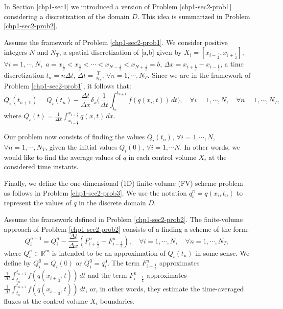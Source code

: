 In Section \ref{chp1-sec1} we introduced a version of Problem \ref{chp1-sec2-prob1}
considering a discretization of the domain $D$. 
This idea is summarized in Problem \ref{chp1-sec2-prob2}.
\begin{prob}
        \label{chp1-sec2-prob2}
	Assume the framework of Problem \ref{chp1-sec2-prob1}.
        We consider positive integers $N$ and $N_T$, a spatial discretization of [a,b] given by
        $X_i = [x_{i-\frac{1}{2}}, x_{i+\frac{1}{2}}]$,
        $\forall i = 1, \cdots, N,$ 
	$a = x_{\frac{1}{2}} < x_{\frac{3}{2}} < \cdots < x_{N-\frac{1}{2}} < x_{N+\frac{1}{2}} = b$,
	$\Delta x = x_{i+\frac{1}{2}}-x_{i-\frac{1}{2}}$,
	a time discretization
        $t_n = n\Delta t$, $\Delta t = \frac{T}{N_T}$, $\forall n = 1, \cdots, N_T$.
	Since we are in the framework of Problem \ref{chp1-sec2-prob1}, it follows that:
        \begin{equation*}
                {Q}_i(t_{n+1}) =  {Q}_i(t_n) -
                \frac{\Delta t}{\Delta x} \delta _x\bigg( \frac{1}{\Delta t}\int_{t_n}^{t_{n+1}}
                {f}({q}(x_{i}, t)) \,dt \bigg),
                \quad \forall i = 1, \cdots, N,
                \quad \forall n = 1, \cdots, N_T,
        \end{equation*}
        where ${Q}_i(t) = \frac{1}{\Delta x}
        \int_{x_{i-\frac{1}{2}}}^{x_{i+\frac{1}{2}}} {q}(x,t) \,dx$.
	
	Our problem now consists of finding the values ${Q}_i(t_{n})$, 
	$\forall i = 1, \cdots, N$, $\forall n = 1, \cdots, N_T$,
	given the initial values ${Q}_i(0)$, $\forall i = 1, \cdots N$.
	In other words, we would like to find the average values of ${q}$
	in each control volume $X_i$ at the considered time instants.
\end{prob}

Finally, we define the one-dimensional (1D) finite-volume (FV)
scheme problem as follows in Problem \ref{chp1-sec2-prob3}.
We use the notation ${q}^n_{i} = {q}(x_i, t_n)$
to represent the values of ${q}$ in the discrete domain $D$.

\begin{prob}[1D-FV scheme]
	\label{chp1-sec2-prob3}
	Assume the framework defined in Problem \ref{chp1-sec2-prob2}.
	The finite-volume approach of Problem \ref{chp1-sec2-prob2}
	consists of a finding a scheme of the form:
        \begin{equation*}
		{Q}_{i}^{n+1} =  {Q}_{i}^{n} -
		\frac{\Delta t}{\Delta x} ({F}_{i+\frac{1}{2}}^{n} - {F}_{i-\frac{1}{2}}^{n}),
                \quad \forall i = 1, \cdots, N,
                \quad \forall n = 1, \cdots, N_T,
        \end{equation*}
	where ${Q}_{i}^{n} \in \mathbb{R}^m$ is intended to be an approximation
	of ${Q}_i(t_{n})$ in some sense. We define by ${Q}_{i}^{0} = {Q}_i(0)$ or
	${Q}_{i}^{0} = {q}^{0}_{i}$.
	The term ${F}_{i+\frac{1}{2}}^{n}$ approximates
	$\frac{1}{\Delta t}\int_{t_n}^{t_{n+1}} {f}({q}(x_{i+\frac{1}{2}}, t)) \,dt $
	and the term
        ${F}_{i-\frac{1}{2}}^{n}$ approximates
	$\frac{1}{\Delta t}\int_{t_n}^{t_{n+1}} {f}({q}(x_{i-\frac{1}{2}}, t)) \,dt $,
	or, in other words, they estimate the time-averaged fluxes at the control volume $X_i$ boundaries.
\end{prob}


